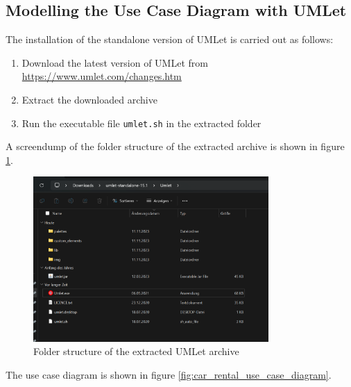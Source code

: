 \subsection*{Modelling the Use Case Diagram with UMLet}
The installation of the standalone version of UMLet is carried out as follows:
\begin{enumerate}
    \item Download the latest version of UMLet from \url{https://www.umlet.com/changes.htm}
    \item Extract the downloaded archive
    \item Run the executable file \texttt{umlet.sh} in the extracted folder
\end{enumerate}

A screendump of the folder structure of the extracted archive is shown in figure \ref{fig:umlet_folder_structure}.
\begin{figure}
    \centering
    \includegraphics[width=0.8\textwidth]{figures/goLang/carRental/carRental_umletInstallation.png}
    \caption{Folder structure of the extracted UMLet archive}
    \label{fig:umlet_folder_structure}
\end{figure}

The use case diagram is shown in figure \ref{fig:car_rental_use_case_diagram}.

